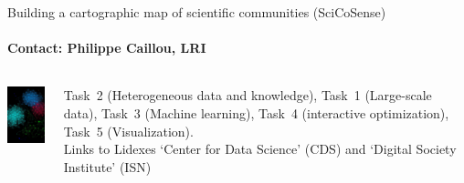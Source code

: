 
\begin{frame}{Building a cartographic map of scientific communities (SciCoSense) }
  \framesubtitle{Contact: Philippe Caillou, LRI}

  \begin{columns}
    \begin{column}{3cm}
      \includegraphics[width=\linewidth]{Images/scicosence-image.png}
    \end{column}
    \begin{column}{8cm}
      Task~2 (Heterogeneous data and knowledge), Task~1 (Large-scale data),
      Task~3 (Machine learning), Task~4 (interactive optimization),
      Task~5 (Visualization).\\
      Links to Lidexes `Center for Data Science' (CDS) and `Digital Society Institute' (ISN)
    \end{column}
  \end{columns}

\end{frame}

